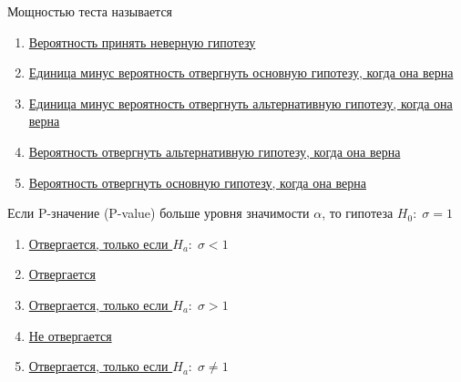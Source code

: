 \documentclass[t]{beamer}
\begin{document}
 \begin{frame} \label{39} 
\begin{block}{39} 

Мощностью теста называется
 


 \end{block} 
\begin{enumerate} 
\item[] \hyperlink{39-No}{\beamergotobutton{} Вероятность принять неверную гипотезу}
\item[] \hyperlink{39-No}{\beamergotobutton{} Единица минус  вероятность отвергнуть основную гипотезу, когда она верна}
\item[] \hyperlink{39-Yes}{\beamergotobutton{} Единица минус  вероятность отвергнуть альтернативную гипотезу, когда она верна}
\item[] \hyperlink{39-No}{\beamergotobutton{} Вероятность отвергнуть альтернативную гипотезу, когда она верна}
\item[] \hyperlink{39-No}{\beamergotobutton{} Вероятность отвергнуть основную гипотезу, когда она верна}
\end{enumerate} 
\end{frame} 


 \begin{frame} \label{40} 
\begin{block}{40} 

Если P-значение (P-value) больше уровня значимости  $\alpha$, то гипотеза  $H_0: \; \sigma=1$


 \end{block} 
\begin{enumerate} 
\item[] \hyperlink{40-No}{\beamergotobutton{} Отвергается, только если  $H_a: \; \sigma<1$}
\item[] \hyperlink{40-No}{\beamergotobutton{} Отвергается}
\item[] \hyperlink{40-No}{\beamergotobutton{} Отвергается, только если  $H_a: \; \sigma>1$}
\item[] \hyperlink{40-Yes}{\beamergotobutton{} Не отвергается}
\item[] \hyperlink{40-No}{\beamergotobutton{} Отвергается, только если  $H_a: \; \sigma\neq 1$}
\end{enumerate} 
\end{frame} 
\end{document}
